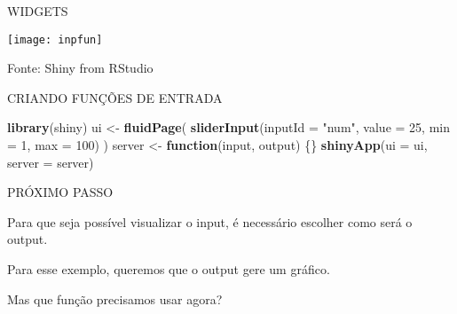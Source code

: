 \documentclass[
  ignorenonframetext,
]{beamer}
\newenvironment{Shaded}{\begin{snugshade}}{\end{snugshade}}
\newcommand{\ControlFlowTok}[1]{\textcolor[rgb]{0.13,0.29,0.53}{\textbf{#1}}}
\newcommand{\DataTypeTok}[1]{\textcolor[rgb]{0.13,0.29,0.53}{#1}}
\newcommand{\DecValTok}[1]{\textcolor[rgb]{0.00,0.00,0.81}{#1}}
\newcommand{\KeywordTok}[1]{\textcolor[rgb]{0.13,0.29,0.53}{\textbf{#1}}}
\newcommand{\NormalTok}[1]{#1}
\newcommand{\StringTok}[1]{\textcolor[rgb]{0.31,0.60,0.02}{#1}}
\begin{document}
\begin{frame}{WIDGETS}
\protect\hypertarget{widgets}{}

\texttt{[image: inpfun]}

\begin{center}
\tiny{Fonte: Shiny from RStudio}
\end{center}

\end{frame}

\begin{frame}[fragile]{CRIANDO FUNÇÕES DE ENTRADA}
\protect\hypertarget{criando-funcoes-de-entrada}{}

\begin{Shaded}
\begin{Highlighting}[]
\KeywordTok{library}\NormalTok{(shiny)}
\NormalTok{ui <-}\StringTok{ }\KeywordTok{fluidPage}\NormalTok{(}
  \KeywordTok{sliderInput}\NormalTok{(}\DataTypeTok{inputId =} \StringTok{"num"}\NormalTok{,}
              \DataTypeTok{value =} \DecValTok{25}\NormalTok{, }\DataTypeTok{min =} \DecValTok{1}\NormalTok{, }\DataTypeTok{max =} \DecValTok{100}\NormalTok{) )}
\NormalTok{server <-}\StringTok{ }\ControlFlowTok{function}\NormalTok{(input, output) \{\}}
\KeywordTok{shinyApp}\NormalTok{(}\DataTypeTok{ui =}\NormalTok{ ui, }\DataTypeTok{server =}\NormalTok{ server)}
\end{Highlighting}
\end{Shaded}

\end{frame}

\begin{frame}{PRÓXIMO PASSO}
\protect\hypertarget{proximo-passo}{}

\begin{center}
Para que seja possível \alert{visualizar} o input, é necessário escolher como será o \alert{output.}
\end{center}
\begin{center}
Para esse exemplo, queremos que o output gere um \alert{gráfico.}
\end{center}
\begin{center}
Mas que \alert{função} precisamos usar agora?
\end{center}

\end{frame}
\end{document}
